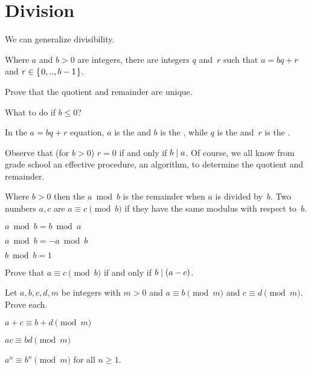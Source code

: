 \documentclass{ibl}
\begin{document}
\section{Division}
We can generalize divisibility.

\begin{ex}
\begin{exes}
\item Where $a$ and $b>0$ are integers, there are integers $q$ and~$r$
such
that $a=bq+r$ and
$r\in\mbox{$\{\hspace{0.1em}0,..,b-1\hspace{0.1em}\}$}$.
\item
Prove that the quotient and remainder are unique.
\item 
What to do if $b\leq 0$?
\end{exes}
\end{ex}


\begin{df}
In the $a=bq+r$ equation, $a$ is the  and
$b$ is the , while 
$q$ is the  and~$r$ is the .  
\end{df}

Observe that (for $b>0$) $r=0$ if and only if $b\mid a$. 
Of course, 
we all know from grade school an effective procedure, an algorithm, to 
determine the quotient and remainder.

\begin{df}
Where $b>0$ then the  $a\bmod b$ 
is the remainder when $a$ is divided by~$b$.
Two numbers $a,c$ are  $a\equiv c\pmod b$ 
if they have the same modulus with respect to~$b$.
\end{df}

\begin{ex}\pord
\begin{exes}
\item $a\bmod b=b\bmod a$
\item $a\bmod b=-a\bmod b$
\item $b\bmod b=1$    
\end{exes}
\end{ex}

\begin{ex}
Prove that $a\equiv c\pmod b$ if and only if $b\mid (a-c)$.  
\end{ex}

\begin{ex}
Let $a,b,c,d,m$ be integers with $m>0$ and
$a\equiv b\pmod m$ and $c\equiv d\pmod m$.
Prove each.
\begin{exes}
\item $a+c\equiv b+d\pmod m$
\item $ac\equiv bd\pmod m$
\item $a^n\equiv b^n\pmod m$ for all $n\geq 1$.    
\end{exes}
\end{ex}
\end{document}
